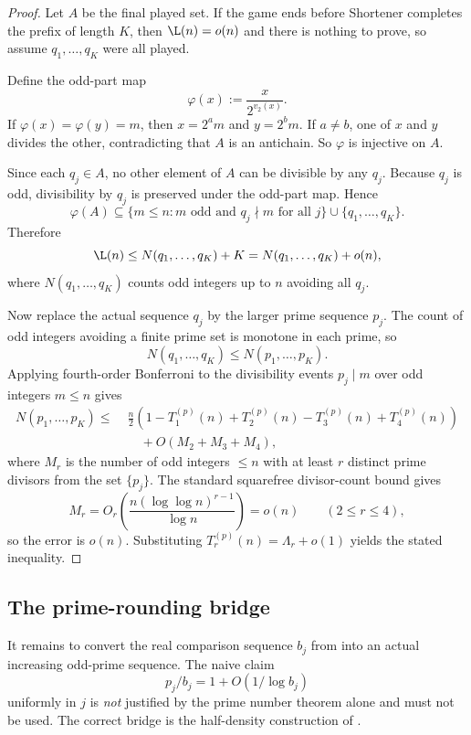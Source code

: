 \begin{proof}
Let $A$ be the final played set.  If the game ends before Shortener completes
the prefix of length $K$, then $\L(n)=o(n)$ and there is nothing to prove, so
assume $q_1,\dots,q_K$ were all played.

Define the odd-part map
\[
  \varphi(x) := \frac{x}{2^{v_2(x)}}.
\]
If $\varphi(x)=\varphi(y)=m$, then $x=2^a m$ and $y=2^b m$.  If $a\neq b$, one
of $x$ and $y$ divides the other, contradicting that $A$ is an antichain.  So
$\varphi$ is injective on $A$.

Since each $q_j\in A$, no other element of $A$ can be divisible by any $q_j$.
Because $q_j$ is odd, divisibility by $q_j$ is preserved under the odd-part
map.  Hence
\[
  \varphi(A)
  \subseteq
  \{m\le n : m \text{ odd and } q_j\nmid m \text{ for all } j\}
  \cup \{q_1,\dots,q_K\}.
\]
Therefore
\[
  \L(n) \le N(q_1,\dots,q_K) + K = N(q_1,\dots,q_K)+o(n),
\]
where $N(q_1,\dots,q_K)$ counts odd integers up to $n$ avoiding all $q_j$.

Now replace the actual sequence $q_j$ by the larger prime sequence $p_j$.  The
count of odd integers avoiding a finite prime set is monotone in each prime, so
\[
  N(q_1,\dots,q_K) \le N(p_1,\dots,p_K).
\]
Applying fourth-order Bonferroni to the divisibility events $p_j \mid m$ over
odd integers $m\le n$ gives
\[
\begin{aligned}
  N(p_1,\dots,p_K)
  \le\;&
  \frac n2
  \left(1-T_1^{(p)}(n)+T_2^{(p)}(n)-T_3^{(p)}(n)+T_4^{(p)}(n)\right) \\
  &\quad + O(M_2+M_3+M_4),
\end{aligned}
\]
where $M_r$ is the number of odd integers $\le n$ with at least $r$ distinct
prime divisors from the set $\{p_j\}$.  The standard squarefree divisor-count
bound gives
\[
  M_r = O_r\!\left(\frac{n(\log\log n)^{r-1}}{\log n}\right)=o(n)
  \qquad (2\le r\le 4),
\]
so the error is $o(n)$.  Substituting $T_r^{(p)}(n)=\Lambda_r+o(1)$ yields the
stated inequality.
\end{proof}

\subsection{The prime-rounding bridge}

It remains to convert the real comparison sequence $b_j$ from
 into an actual increasing odd-prime sequence.
The naive claim
\[
  p_j/b_j = 1 + O(1/\log b_j)
\]
uniformly in $j$ is \emph{not} justified by the prime number theorem alone and
must not be used.  The correct bridge is the half-density construction of
.

